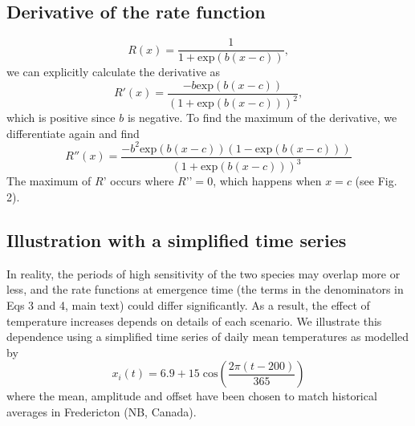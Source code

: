 \documentclass[12 pt]{article}
\begin{document}
\subsection*{Derivative of the rate function}
\begin{equation}
    R(x)=\frac{1}{1+\mathrm{exp}(b(x-c))}, \tag*{Eq. S\theequation}
\end{equation}
we can explicitly calculate the derivative as
\begin{equation}
    R'(x)=\frac{-b \mathrm{exp}(b(x-c))}{(1+\mathrm{exp}(b(x-c)))^2}, \tag*{Eq. S\theequation}
\end{equation}
which is positive since $b$ is negative. To find the maximum of the derivative, we differentiate again and find
\begin{equation}
    R''(x) = \frac{-b^2 \mathrm{exp}(b(x-c))(1-\mathrm{exp}(b(x-c)))}{(1+\mathrm{exp}(b(x-c)))^3} \tag*{Eq. S\theequation}
\end{equation}
The maximum of $R’$ occurs where $R’’ = 0$, which happens when $x = c$ (see Fig. 2).

\subsection*{Illustration with a simplified time series}
In reality, the periods of high sensitivity of the two species may overlap more or less, and the rate functions at emergence time (the terms in the denominators in Eqs 3 and 4, main text) could differ significantly. As a result, the effect of temperature increases depends on details of each scenario. We illustrate this dependence using a simplified time series of daily mean temperatures as modelled by
\begin{equation}
	x_i (t)=6.9+15 \; \text{cos} \left( \frac{2 \pi (t-200)}{365} \right)	\tag*{Eq. S\theequation}
\end{equation}
where the mean, amplitude and offset have been chosen to match historical averages in Fredericton (NB, Canada).  %
\end{document}
